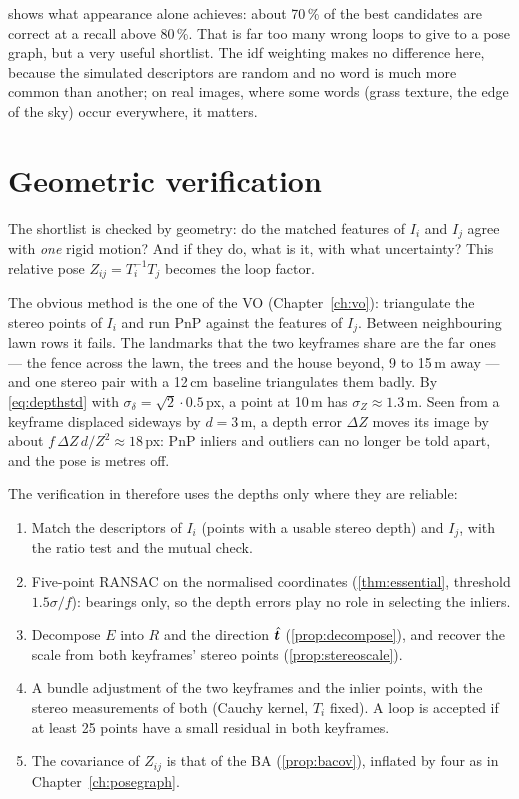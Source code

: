  shows what appearance alone achieves: about 70\,\% of
the best candidates are correct at a recall above 80\,\%. That is far
too many wrong loops to give to a pose graph, but a very useful
shortlist. The idf weighting makes no difference here, because the
simulated descriptors are random and no word is much more common than
another; on real images, where some words (grass texture, the edge of
the sky) occur everywhere, it matters.

\section{Geometric verification}

The shortlist is checked by geometry: do the matched features of $I_i$
and $I_j$ agree with \emph{one} rigid motion? And if they do, what is
it, with what uncertainty? This relative pose $Z_{ij}=T_i^{-1}T_j$
becomes the loop factor.

The obvious method is the one of the VO (Chapter~\ref{ch:vo}):
triangulate the stereo points of $I_i$ and run PnP against the features
of $I_j$. Between neighbouring lawn rows it fails. The landmarks that
the two keyframes share are the far ones --- the fence across the lawn,
the trees and the house beyond, 9 to 15\,m away --- and one stereo pair
with a 12\,cm baseline triangulates them badly. By \eqref{eq:depthstd}
with $\sigma_\delta=\sqrt2\cdot0.5$\,px, a point at 10\,m has
$\sigma_Z\approx1.3$\,m. Seen from a keyframe displaced sideways by
$d=3$\,m, a depth error $\Delta Z$ moves its image by about
$f\,\Delta Z\,d/Z^2\approx18$\,px: PnP inliers and outliers can no
longer be told apart, and the pose is metres off.

The verification in  therefore uses the depths only
where they are reliable:
\begin{enumerate}[nosep]
\item Match the descriptors of $I_i$ (points with a usable stereo depth)
  and $I_j$, with the ratio test and the mutual check.
\item Five-point RANSAC on the normalised coordinates
  (\cref{thm:essential}, threshold $1.5\sigma/f$): bearings only, so the
  depth errors play no role in selecting the inliers.
\item Decompose $E$ into $R$ and the direction $\hat{\bm{t}}$
  (\cref{prop:decompose}), and recover the scale from both keyframes'
  stereo points (\cref{prop:stereoscale}).
\item A bundle adjustment of the two keyframes and the inlier points,
  with the stereo measurements of both (Cauchy kernel, $T_i$ fixed). A
  loop is accepted if at least 25 points have a small residual in both
  keyframes.
\item The covariance of $Z_{ij}$ is that of the BA (\cref{prop:bacov}),
  inflated by four as in Chapter~\ref{ch:posegraph}.
\end{enumerate}

